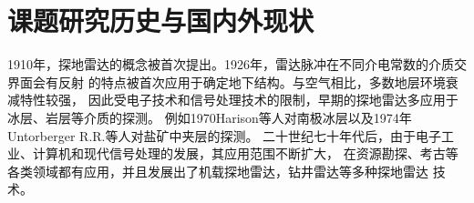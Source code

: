 \section{课题研究历史与国内外现状}
1910年，探地雷达的概念被首次提出。1926年，雷达脉冲在不同介电常数的介质交界面会有反射
的特点被首次应用于确定地下结构。与空气相比，多数地层环境衰减特性较强，
因此受电子技术和信号处理技术的限制，早期的探地雷达多应用于冰层、岩层等介质的探测。
例如1970Harison等人对南极冰层以及1974年Untorberger R.R.等人对盐矿中夹层的探测。
二十世纪七十年代后，由于电子工业、计算机和现代信号处理的发展，其应用范围不断扩大，
在资源勘探、考古等各类领域都有应用，并且发展出了机载探地雷达，钻井雷达等多种探地雷达
技术。

